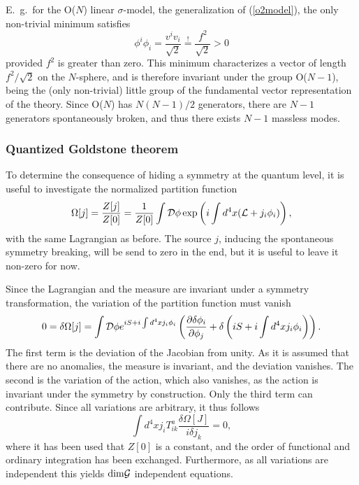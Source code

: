 \documentclass[final,twoside,12pt]{article}
\newcommand*{\La}{{\cal{L}}}
\newcommand*{\no}{\noindent}
\newcommand*{\be}{\begin{equation}}
\newcommand*{\ee}{\end{equation}}
\newcommand*{\pd}{\partial}
\newcommand*{\pref}[1]{(\ref{#1})}
\newcommand*{\nn}{\nonumber}
\newcommand*{\1}{1\!\!\!\bot}
\begin{document}
E.\ g.\ for the O($N$) linear $\sigma$-model, the generalization of \pref{o2model}, the only non-trivial minimum satisfies
\be
\phi^i\phi_i=\frac{v^iv_i}{\sqrt{2}}\stackrel{!}{=}\frac{f^2}{\sqrt{2}}>0\nn
\ee
\no provided $f^2$ is greater than zero. This minimum characterizes a vector of length $f^2/\sqrt{2}$ on the $N$-sphere, and is therefore invariant under the group O($N-1$), being the (only non-trivial) little group of the fundamental vector representation of the theory. Since O($N$) has $N(N-1)/2$ generators, there are $N-1$ generators spontaneously broken, and thus there exists $N-1$ massless modes.

\subsubsection{Quantized Goldstone theorem}\label{ss:qgoldstone}

To determine the consequence of hiding a symmetry at the quantum level, it is useful to investigate the normalized partition function
\be
\Omega[j]=\frac{Z[j]}{Z[0]}=\frac{1}{Z[0]}\int{\cal D}\phi\exp\left(i\int d^4x(\La+j_i\phi_i)\right)\nn,
\ee
\no with the same Lagrangian as before. The source $j$, inducing the spontaneous symmetry breaking, will be send to zero in the end, but it is useful to leave it non-zero for now.

Since the Lagrangian and the measure are invariant under a symmetry transformation, the variation of the partition function must vanish
\be
0=\delta\Omega[j]=\int {\cal D}\phi e^{iS+i\int d^4 xj_i\phi_i}\left(\frac{\pd\delta\phi_i}{\pd\phi_j}+\delta\left(iS+i \int d^4xj_i\phi_i\right)\right)\nn.
\ee
\no The first term is the deviation of the Jacobian from unity. As it is assumed that there are no anomalies, the measure is invariant, and the deviation vanishes. The second is the variation of the action, which also vanishes, as the action is invariant under the symmetry by construction. Only the third term can contribute. Since all variations are arbitrary, it thus follows
\be
\int d^4x j_i T_{ik}^a\frac{\delta \Omega[J]}{i\delta j_k}=0\nn,
\ee
\no where it has been used that $Z[0]$ is a constant, and the order of functional and ordinary integration has been exchanged. Furthermore, as all variations are independent this yields $\mathrm{dim}{\cal G}$ independent equations.
\end{document}
